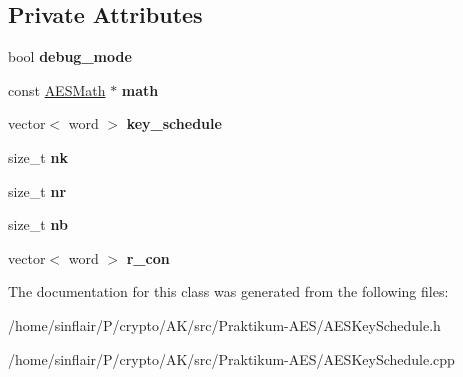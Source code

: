 \subsection*{Private Attributes}
\begin{DoxyCompactItemize}
\item 
\mbox{\label{classAESKeySchedule_acc285c92fcb93788200e55394eec203f}} 
bool {\bfseries debug\+\_\+mode}
\item 
\mbox{\label{classAESKeySchedule_a162cfe0b093a9be2b453ac5c98989003}} 
const \hyperlink{classAESMath}{A\+E\+S\+Math} $\ast$ {\bfseries math}
\item 
\mbox{\label{classAESKeySchedule_a90cad5ffb14d9d1a4859a5d13d8fc7f1}} 
vector$<$ word $>$ {\bfseries key\+\_\+schedule}
\item 
\mbox{\label{classAESKeySchedule_a593c5d93b975f7dc0cf97268d3dcefe2}} 
size\+\_\+t {\bfseries nk}
\item 
\mbox{\label{classAESKeySchedule_abcf3fa65d61199529bda9e8cdbcf695c}} 
size\+\_\+t {\bfseries nr}
\item 
\mbox{\label{classAESKeySchedule_ae2d77a9ded72d3bc8b528a761a2dff97}} 
size\+\_\+t {\bfseries nb}
\item 
\mbox{\label{classAESKeySchedule_a4863c7f53dc841517aa077758924d377}} 
vector$<$ word $>$ {\bfseries r\+\_\+con}
\end{DoxyCompactItemize}


The documentation for this class was generated from the following files\+:\begin{DoxyCompactItemize}
\item 
/home/sinflair/\+P/crypto/\+A\+K/src/\+Praktikum-\/\+A\+E\+S/A\+E\+S\+Key\+Schedule.\+h\item 
/home/sinflair/\+P/crypto/\+A\+K/src/\+Praktikum-\/\+A\+E\+S/A\+E\+S\+Key\+Schedule.\+cpp\end{DoxyCompactItemize}
